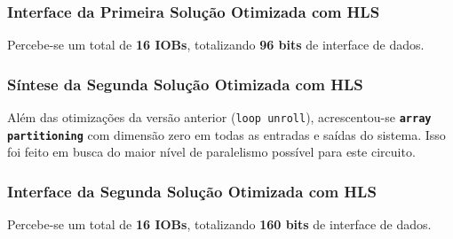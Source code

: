 \documentclass{beamer}
\begin{document}
    \begin{frame}
        \frametitle{Interface da Primeira Solução Otimizada com HLS}

        \begingroup {}
        Percebe-se um total de \textbf{16 IOBs}, totalizando
        \textbf{96 bits} de interface de dados.
        \endgroup

        \begin{figure}[h] 
            \centering
          \end{figure}
    \end{frame}

    \begin{frame}
        \frametitle{Síntese da Segunda Solução Otimizada com HLS}

        \begingroup {}
        Além das otimizações da versão anterior (\texttt{loop unroll}), acrescentou-se
        \textbf{\texttt{array partitioning}} com dimensão zero em todas as entradas e
        saídas do sistema. Isso foi feito em busca do maior nível de paralelismo possível
        para este circuito.
        \endgroup

        \begin{figure}[h] 
            \centering
          \end{figure}
    \end{frame}

    \begin{frame}
        \frametitle{Interface da Segunda Solução Otimizada com HLS}

        \begingroup {}
        Percebe-se um total de \textbf{16 IOBs}, totalizando
        \textbf{160 bits} de interface de dados.
        \endgroup

        \begin{figure}[h] 
            \centering
          \end{figure}
    \end{frame}
\end{document}
